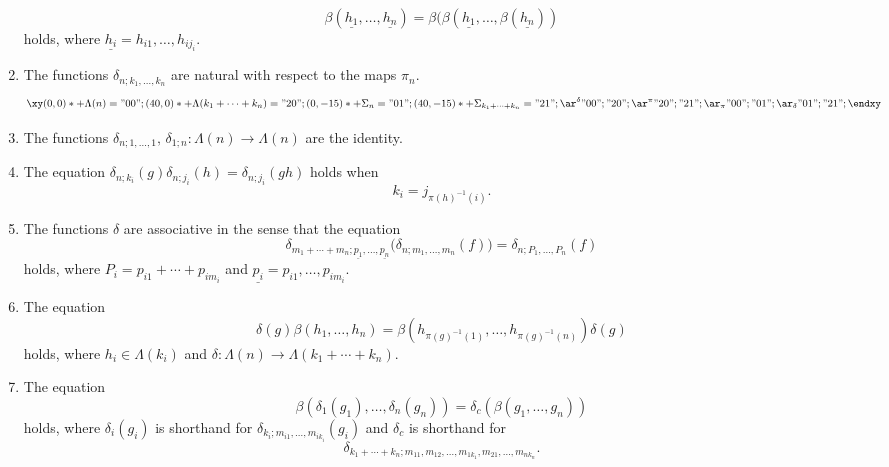 \documentclass{amsbook} %
\numberwithin{section}{chapter}
\begin{document}
\begin{thm}
\begin{enumerate}
\[
  \beta(\underline{h_1},\ldots,\underline{h_n}) = \beta(\beta(\underline{h_1},\ldots,\beta(\underline{h_n}))
\]
holds, where $\underline{h_i} = h_{i1},\ldots,h_{ij_i}$.
\item\label{eq4} The functions $\delta_{n; k_{1}, \ldots, k_{n}}$ are natural with respect to the maps $\pi_{n}$.
\[
\xy
(0,0)*+{\Lambda(n)} ="00";
(40,0)*+{\Lambda(k_{1} + \cdots + k_{n}) } ="20";
(0,-15)*+{\Sigma_{n}  } ="01";
(40,-15)*+{\Sigma_{k_{1} + \cdots + k_{n}} } ="21";
{\ar^{\delta} "00" ; "20"};
{\ar^{\pi} "20" ; "21"};
{\ar_{\pi} "00" ; "01"};
{\ar_{\delta} "01" ; "21"};
\endxy
\]
\item\label{eq5} The functions $\delta_{n; 1, \ldots, 1}, \, \delta_{1;n} \colon \Lambda(n) \to \Lambda(n)$ are the identity.
\item\label{eq6} The equation $\delta_{n; k_{i}}(g) \delta_{n; j_{i}}(h) = \delta_{n; j_{i}}(gh)$ holds when
\[
k_{i} = j_{\pi(h)^{-1}(i)}.
\]
\item\label{eq7} The functions $\delta$ are associative in the sense that the equation
\[
\delta_{m_1 + \cdots + m_n; \underline{p_1},\ldots,\underline{p_n}}\big( \delta_{n; m_{1}, \ldots, m_{n}}(f) \big) = \delta_{n; P_{1}, \ldots, P_{n}}(f)
\]
holds, where $P_{i} = p_{i1} + \cdots + p_{im_{i}}$ and $\underline{p_i} = p_{i1}, \ldots, p_{im_i}$.
\item\label{eq8} The equation
\[
\delta(g) \beta(h_{1}, \ldots, h_{n}) = \beta(h_{\pi(g)^{-1}(1)}, \ldots,  h_{\pi(g)^{-1}(n)}) \delta(g)
\]
holds, where $h_{i} \in \Lambda(k_{i})$ and $\delta \colon \Lambda(n) \rightarrow \Lambda(k_{1} + \cdots + k_{n})$.
\item\label{eq9} The equation
\[
\beta(\delta_{1}(g_{1}), \ldots, \delta_{n}(g_{n})) = \delta_{c}(\beta(g_{1}, \ldots, g_{n}))
\]
holds, where $\delta_{i}(g_{i})$ is shorthand for $\delta_{k_{i}; m_{i1}, \ldots, m_{ik_{i}}}(g_{i})$ and $\delta_{c}$ is shorthand for
\[
\delta_{k_{1}+\cdots + k_{n}; m_{11}, m_{12}, \ldots, m_{1k_{1}}, m_{21}, \ldots, m_{nk_{n}}}.
\]
\end{enumerate}
\end{thm}
\end{document}
